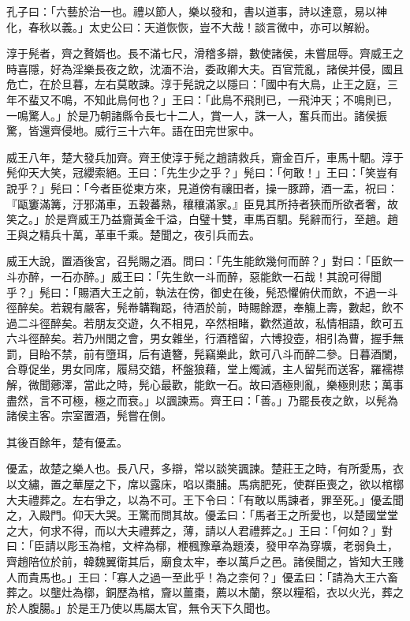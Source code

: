 
\begin{pinyinscope}
孔子曰：「六藝於治一也。禮以節人，樂以發和，書以道事，詩以達意，易以神化，春秋以義。」太史公曰：天道恢恢，豈不大哉！談言微中，亦可以解紛。

淳于髡者，齊之贅婿也。長不滿七尺，滑稽多辯，數使諸侯，未嘗屈辱。齊威王之時喜隱，好為淫樂長夜之飲，沈湎不治，委政卿大夫。百官荒亂，諸侯并侵，國且危亡，在於旦暮，左右莫敢諫。淳于髡說之以隱曰：「國中有大鳥，止王之庭，三年不蜚又不鳴，不知此鳥何也？」王曰：「此鳥不飛則已，一飛沖天；不鳴則已，一鳴驚人。」於是乃朝諸縣令長七十二人，賞一人，誅一人，奮兵而出。諸侯振驚，皆還齊侵地。威行三十六年。語在田完世家中。

威王八年，楚大發兵加齊。齊王使淳于髡之趙請救兵，齎金百斤，車馬十駟。淳于髡仰天大笑，冠纓索絕。王曰：「先生少之乎？」髡曰：「何敢！」王曰：「笑豈有說乎？」髡曰：「今者臣從東方來，見道傍有禳田者，操一豚蹄，酒一盂，祝曰：『甌窶滿篝，汙邪滿車，五穀蕃熟，穰穰滿家。』臣見其所持者狹而所欲者奢，故笑之。」於是齊威王乃益齎黃金千溢，白璧十雙，車馬百駟。髡辭而行，至趙。趙王與之精兵十萬，革車千乘。楚聞之，夜引兵而去。

威王大說，置酒後宮，召髡賜之酒。問曰：「先生能飲幾何而醉？」對曰：「臣飲一斗亦醉，一石亦醉。」威王曰：「先生飲一斗而醉，惡能飲一石哉！其說可得聞乎？」髡曰：「賜酒大王之前，執法在傍，御史在後，髡恐懼俯伏而飲，不過一斗徑醉矣。若親有嚴客，髡帣韝鞠跽，待酒於前，時賜餘瀝，奉觴上壽，數起，飲不過二斗徑醉矣。若朋友交遊，久不相見，卒然相睹，歡然道故，私情相語，飲可五六斗徑醉矣。若乃州閭之會，男女雜坐，行酒稽留，六博投壺，相引為曹，握手無罰，目眙不禁，前有墮珥，后有遺簪，髡竊樂此，飲可八斗而醉二參。日暮酒闌，合尊促坐，男女同席，履舄交錯，杯盤狼藉，堂上燭滅，主人留髡而送客，羅襦襟解，微聞薌澤，當此之時，髡心最歡，能飲一石。故曰酒極則亂，樂極則悲；萬事盡然，言不可極，極之而衰。」以諷諫焉。齊王曰：「善。」乃罷長夜之飲，以髡為諸侯主客。宗室置酒，髡嘗在側。

其後百餘年，楚有優孟。

優孟，故楚之樂人也。長八尺，多辯，常以談笑諷諫。楚莊王之時，有所愛馬，衣以文繡，置之華屋之下，席以露床，啗以棗脯。馬病肥死，使群臣喪之，欲以棺槨大夫禮葬之。左右爭之，以為不可。王下令曰：「有敢以馬諫者，罪至死。」優孟聞之，入殿門。仰天大哭。王驚而問其故。優孟曰：「馬者王之所愛也，以楚國堂堂之大，何求不得，而以大夫禮葬之，薄，請以人君禮葬之。」王曰：「何如？」對曰：「臣請以彫玉為棺，文梓為槨，楩楓豫章為題湊，發甲卒為穿壙，老弱負土，齊趙陪位於前，韓魏翼衛其后，廟食太牢，奉以萬戶之邑。諸侯聞之，皆知大王賤人而貴馬也。」王曰：「寡人之過一至此乎！為之柰何？」優孟曰：「請為大王六畜葬之。以壟灶為槨，銅歷為棺，齎以薑棗，薦以木蘭，祭以糧稻，衣以火光，葬之於人腹腸。」於是王乃使以馬屬太官，無令天下久聞也。


\end{pinyinscope}

